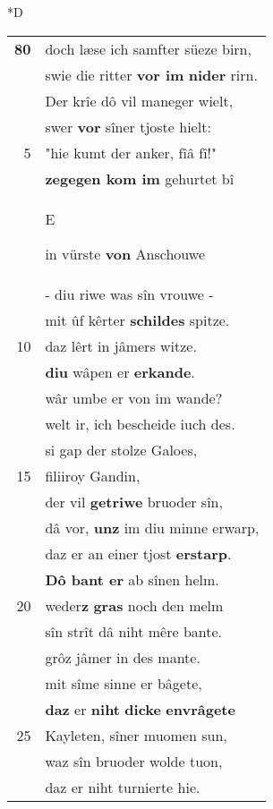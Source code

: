 \documentclass[8pt,a4paper,notitlepage]{article}
\begin{document}
\begin{table}[ht]
\begin{minipage}[t]{0.5\linewidth}
\small
\begin{center}*D
\end{center}
\begin{tabular}{rl}
\textbf{80} & doch læse ich samfter süeze birn,\\ 
 & swie die ritter \textbf{vor im} \textbf{nider} rirn.\\ 
 & Der krîe dô vil maneger wielt,\\ 
 & swer \textbf{vor} sîner tjoste hielt:\\ 
5 & "hie kumt der anker, fîâ fî!"\\ 
 & \textbf{zegegen kom im} gehurtet bî\\ 
 & \begin{large}E\end{large}in vürste \textbf{von} Anschouwe\\ 
 & - diu riwe was sîn vrouwe -\\ 
 & mit ûf kêrter \textbf{schildes} spitze.\\ 
10 & daz lêrt in jâmers witze.\\ 
 & \textbf{diu} wâpen er \textbf{erkande}.\\ 
 & wâr umbe er von im wande?\\ 
 & welt ir, ich bescheide iuch des.\\ 
 & si gap der stolze Galoes,\\ 
15 & filiiroy Gandin,\\ 
 & der vil \textbf{getriwe} bruoder sîn,\\ 
 & dâ vor, \textbf{unz} im diu minne erwarp,\\ 
 & daz er an einer tjost \textbf{erstarp}.\\ 
 & \textbf{Dô bant er} ab sînen helm.\\ 
20 & weder\textbf{z} \textbf{gras} noch den melm\\ 
 & sîn strît dâ niht mêre bante.\\ 
 & grôz jâmer in des mante.\\ 
 & mit sîme sinne er bâgete,\\ 
 & \textbf{daz} er \textbf{niht} \textbf{dicke} \textbf{en}\textbf{vrâgete}\\ 
25 & Kayleten, sîner muomen sun,\\ 
 & waz sîn bruoder wolde tuon,\\ 
 & daz er niht turnierte hie.\\ 

\end{tabular}
\end{minipage}
\end{table}
\end{document}
